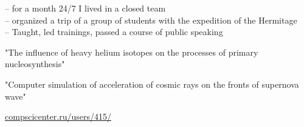 \vspace{-1.5em}
\begin{multicols}{2}
 \givenskill

 \givenskill
\end{multicols}

    \cvtag{\LaTeX}

\divider


 -- for a month 24/7 I lived in a closed team\\[0.5em]
 -- organized a trip of a group of students with the expedition of the Hermitage\\[0.5em]
 -- Taught, led trainings, passed a course of public speaking\\[0.5em]

"The influence of heavy helium isotopes on the processes of primary nucleosynthesis"

\vspace{0.5em}
"Computer simulation of acceleration of cosmic rays on the fronts of supernova wave"

\vspace{0.5em}
\href{https://compscicenter.ru/users/415/}{compscicenter.ru/users/415/}
